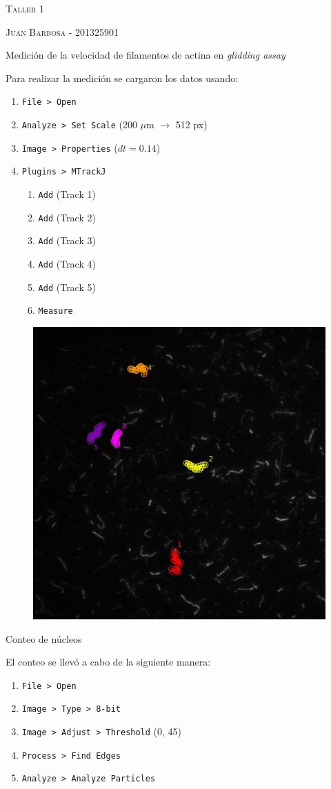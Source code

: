 \documentclass[addpoints,10pt]{exam}
\begin{document}
	\begin{center}
		\LARGE\scshape{Taller 1}
		
		\vspace{1cm}
		\large\scshape{Juan Barbosa - 201325901}
	\end{center}

	\begin{questions}
		{
			\question
			Medici\'on de la velocidad de filamentos de actina en \textit{glidding assay}
		}
				
		Para realizar la medici\'on se cargaron los datos usando:
		\begin{enumerate}
			\item \texttt{File > Open}
			\item \texttt{Analyze > Set Scale} (200 $\mu$m $\longrightarrow$ 512 px)
			\item \texttt{Image > Properties} ($dt = 0.14$)
			\item \texttt{Plugins > MTrackJ}
			\begin{enumerate}
				\item \texttt{Add} (Track 1)
				\item \texttt{Add} (Track 2)
				\item \texttt{Add} (Track 3)
				\item \texttt{Add} (Track 4)
				\item \texttt{Add} (Track 5)
				\item \texttt{Measure}
			\end{enumerate}
		\end{enumerate}
		
		\begin{figure}[h]
			\centering
			\includegraphics[width=0.35\linewidth]{trackimg.png}
		\end{figure}
		
		
		
		{\question Conteo de n\'ucleos}
		
		El conteo se llev\'o a cabo de la siguiente manera:
		\begin{enumerate}
			\item \texttt{File > Open}
			\item \texttt{Image > Type > 8-bit}
			\item \texttt{Image > Adjust > Threshold} (0, 45)
			\item \texttt{Process > Find Edges}
			\item \texttt{Analyze > Analyze Particles}
		\end{enumerate}
	

\end{questions}
\end{document}
